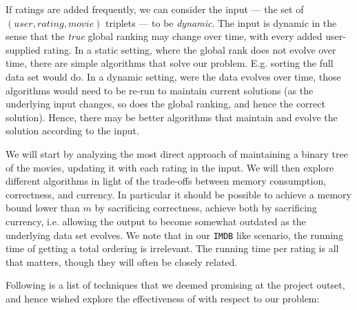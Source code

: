 \documentclass[a4paper, titlepage]{report}
\renewcommand{\%}{\scalebox{.9}{\oldpct}}
\begin{document}
If ratings are added frequently, we can consider the input --- the set of
$(user, rating, movie)$ triplets --- to be \textit{dynamic}. The input is dynamic
in the sense that the \textit{true} global ranking may change over time, with
every added user-supplied rating.
In a static setting, where the global rank does not evolve over time, there are
simple algorithms that solve our problem. E.g. sorting the full data set would
do.
In a dynamic setting, were the data evolves over time,
those algorithms would need to be re-run to maintain current solutions (as the
underlying input changes, so does the global ranking, and hence the correct
solution). Hence, there may be better algorithms that maintain and evolve the
solution according to the input.

We will start by analyzing the most direct approach of maintaining a binary
tree of the movies, updating it with each rating in the input.
We will then explore different algorithms in light of the trade-offs between
memory consumption, correctness, and currency. In particular it should be
possible to achieve a memory bound lower than $m$ by sacrificing correctness,
achieve both by sacrificing currency, i.e. allowing the output to become
somewhat outdated as the underlying data set evolves. We note that in our
\texttt{IMDB} like scenario, the running time of getting a total ordering is
irrelevant. The running time per rating is all that matters, though they will
often be closely related.

Following is a list of techniques that we deemed promising at the project
outset, and hence wished explore the effectiveness of with respect to our
problem:
\end{document}
